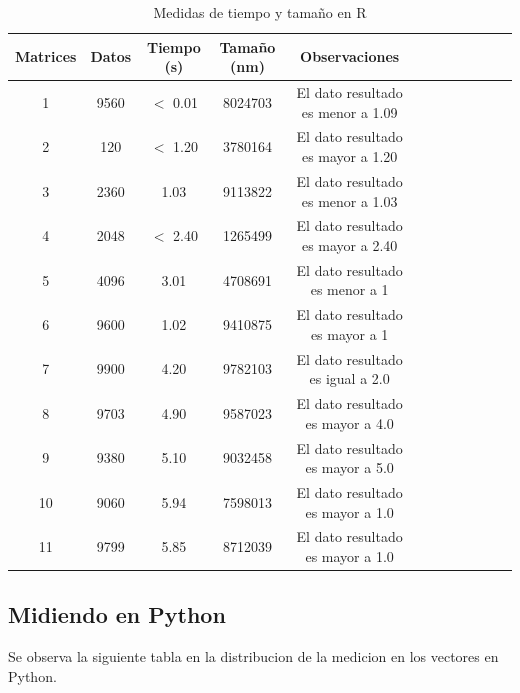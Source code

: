 \documentclass{article}
\begin{document}
\begin{table}[h!]
    \centering
    \caption{Medidas de tiempo y tamaño en R}
    \begin{tabular}{|c|c|c|c||c|c|c|c||c|c|c|c|}
    \hline
       Matrices  & Datos & Tiempo (s) & Tamaño (nm) & Observaciones  \\
       \hline\hline
        1 & 9560 & $<$ 0.01 & 8024703 & El dato resultado es menor a 1.09 \\
        \hline
        2 & 120 & $<$ 1.20 & 3780164 & El dato resultado es mayor a 1.20 \\
        \hline
        3 & 2360 &  1.03 & 9113822 & El dato resultado es menor a 1.03 \\
        \hline
        4 & 2048 & $<$ 2.40 & 1265499 & El dato resultado es mayor a 2.40\\
        \hline
        5 & 4096 & 3.01 & 4708691 & El dato resultado es menor a 1\\
        \hline
        6 & 9600 & 1.02 & 9410875 & El dato resultado es mayor a 1 \\
        \hline
        7 & 9900 & 4.20 & 9782103 & El dato resultado es igual a 2.0\\
        \hline
        8 & 9703 & 4.90 & 9587023 & El dato resultado es mayor a 4.0 \\
        \hline
        9 & 9380 & 5.10 & 9032458 & El dato resultado es mayor a 5.0 \\
        \hline
        10 & 9060 & 5.94 & 7598013 & El dato resultado es mayor a 1.0\\
        \hline
        11 & 9799 & 5.85 & 8712039 & El dato resultado es mayor a 1.0\\
        \hline
    \end{tabular}
    \label{medir_R}
\end{table}

\subsection{Midiendo en Python}

Se observa la siguiente tabla en la distribucion de la medicion en los vectores en Python.
\end{document}
